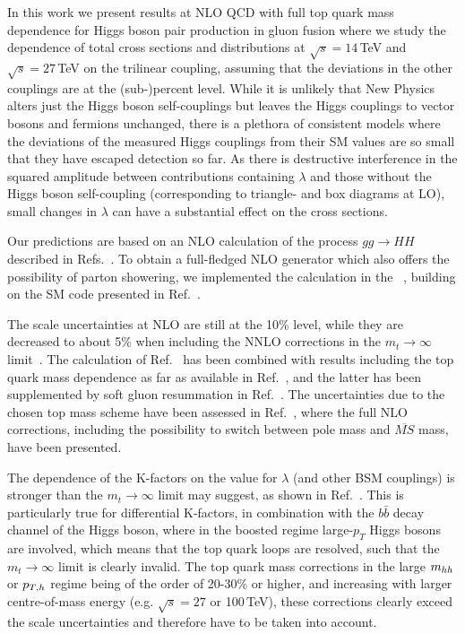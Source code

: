 \medskip

In this work we present results at NLO QCD with full top quark mass dependence for Higgs boson pair production in gluon fusion where we study the dependence of total cross sections and distributions at $\sqrt{s}=14$\,TeV and $\sqrt{s}=27$\,TeV on the trilinear coupling, assuming that the deviations in the other couplings are at the (sub-)percent level.
While it is unlikely that New Physics alters just the Higgs boson self-couplings but leaves the Higgs couplings to vector bosons and fermions unchanged, there is a plethora of consistent models where the deviations of the measured Higgs couplings from their SM values are so small that they have escaped detection so far. 
As there is destructive interference in the squared amplitude between contributions containing $\lambda$ and those without the Higgs boson self-coupling (corresponding to triangle- and box diagrams at LO), 
small changes in $\lambda$ can have a substantial effect on the cross sections.

Our predictions are based on an NLO calculation of the process $gg\to HH$ described in Refs.~\cite{Borowka:2016ehy,Borowka:2016ypz}. 
To obtain a full-fledged NLO generator which also offers the possibility of parton showering, we implemented the calculation in the 
\powhegbox~\cite{Nason:2004rx,Frixione:2007vw,Alioli:2010xd}, building on the SM code presented in Ref.~\cite{Heinrich:2017kxx}.

The scale uncertainties at NLO are still at the 10\% level, while they are decreased to about 5\% when including the NNLO corrections
in the $m_t\to\infty$ limit~\cite{deFlorian:2013jea,Grigo:2015dia,deFlorian:2016uhr}. The calculation of Ref.~\cite{deFlorian:2016uhr} has been combined with results including the top quark mass dependence as far as available in Ref.~\cite{Grazzini:2018bsd}, and the latter has been supplemented by soft gluon resummation in Ref.~\cite{deFlorian:2018tah}. 
The uncertainties due to the chosen top mass scheme have been assessed in Ref.~\cite{Baglio:2018lrj}, where the full NLO corrections, including the possibility to switch between pole mass and $\overline{MS}$ mass, have been presented.

The dependence of the K-factors on the value for $\lambda$ (and other BSM couplings) is stronger than the $m_t\to\infty$ limit may suggest, as shown in Ref.~\cite{Buchalla:2018yce}. This is particularly true for differential K-factors, 
in combination with the $b\bar{b}$ decay channel of the Higgs boson, where in the boosted regime large-$p_T$ Higgs bosons are involved, which means that the top quark loops are resolved, such that the  $m_t\to\infty$ limit is clearly invalid.
The top quark mass corrections in the large $m_{hh}$ or $p_{T,h}$ regime being of the order of 20-30\% or higher, and increasing with larger centre-of-mass energy (e.g. $\sqrt{s}=27$ or 100\,TeV), these corrections clearly exceed the scale uncertainties and therefore have to be taken into account.

